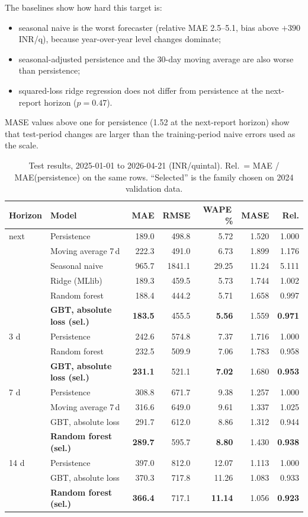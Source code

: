The baselines show how hard this target is:
\begin{itemize}
  \item seasonal naive is the worst forecaster (relative MAE 2.5--5.1, bias above $+390$ INR/q), because year-over-year level changes dominate;
  \item seasonal-adjusted persistence and the 30-day moving average are also worse than persistence;
  \item squared-loss ridge regression does not differ from persistence at the next-report horizon ($p=0.47$).
\end{itemize}

MASE values above one for persistence (1.52 at the next-report horizon) show that test-period changes are larger than the training-period naive errors used as the scale.

\begin{table}[t]
\centering\small
\caption{Test results, 2025-01-01 to 2026-04-21 (INR/quintal). Rel.\ = MAE / MAE(persistence) on the same rows. ``Selected'' is the family chosen on 2024 validation data.}\label{tab:main}
\begin{tabular}{@{}llrrrrr@{}}
\toprule
Horizon & Model & MAE & RMSE & WAPE\,\% & MASE & Rel. \\
\midrule
next & Persistence & 189.0 & 498.8 & 5.72 & 1.520 & 1.000 \\
     & Moving average 7\,d & 222.3 & 491.0 & 6.73 & 1.899 & 1.176 \\
     & Seasonal naive & 965.7 & 1841.1 & 29.25 & 11.24 & 5.111 \\
     & Ridge (MLlib) & 189.3 & 459.5 & 5.73 & 1.744 & 1.002 \\
     & Random forest & 188.4 & 444.2 & 5.71 & 1.658 & 0.997 \\
     & \textbf{GBT, absolute loss (sel.)} & \textbf{183.5} & 455.5 & \textbf{5.56} & 1.559 & \textbf{0.971} \\
\midrule
3 d  & Persistence & 242.6 & 574.8 & 7.37 & 1.716 & 1.000 \\
     & Random forest & 232.5 & 509.9 & 7.06 & 1.783 & 0.958 \\
     & \textbf{GBT, absolute loss (sel.)} & \textbf{231.1} & 521.1 & \textbf{7.02} & 1.680 & \textbf{0.953} \\
\midrule
7 d  & Persistence & 308.8 & 671.7 & 9.38 & 1.257 & 1.000 \\
     & Moving average 7\,d & 316.6 & 649.0 & 9.61 & 1.337 & 1.025 \\
     & GBT, absolute loss & 291.7 & 612.0 & 8.86 & 1.312 & 0.944 \\
     & \textbf{Random forest (sel.)} & \textbf{289.7} & 595.7 & \textbf{8.80} & 1.430 & \textbf{0.938} \\
\midrule
14 d & Persistence & 397.0 & 812.0 & 12.07 & 1.113 & 1.000 \\
     & GBT, absolute loss & 370.3 & 717.8 & 11.26 & 1.083 & 0.933 \\
     & \textbf{Random forest (sel.)} & \textbf{366.4} & 717.1 & \textbf{11.14} & 1.056 & \textbf{0.923} \\
\bottomrule
\end{tabular}
\end{table}

